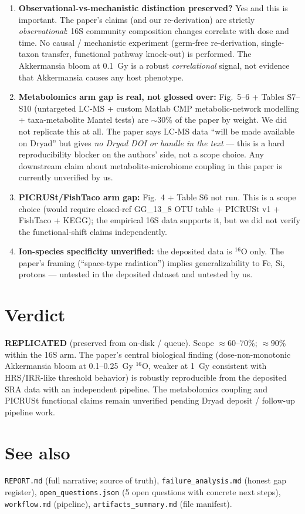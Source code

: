 \documentclass[11pt]{article}
\begin{document}
\begin{enumerate}
  \item \textbf{Observational-vs-mechanistic distinction preserved?} Yes and this is important. The paper's claims (and our re-derivation) are strictly \emph{observational}: 16S community composition changes correlate with dose and time. No causal / mechanistic experiment (germ-free re-derivation, single-taxon transfer, functional pathway knock-out) is performed. The Akkermansia bloom at 0.1~Gy is a robust \emph{correlational} signal, not evidence that Akkermansia causes any host phenotype.
  \item \textbf{Metabolomics arm gap is real, not glossed over:} Fig.~5--6 + Tables S7--S10 (untargeted LC-MS + custom Matlab CMP metabolic-network modelling + taxa-metabolite Mantel tests) are $\sim$30\% of the paper by weight. We did not replicate this at all. The paper says LC-MS data ``will be made available on Dryad'' but gives \emph{no Dryad DOI or handle in the text} --- this is a hard reproducibility blocker on the authors' side, not a scope choice. Any downstream claim about metabolite-microbiome coupling in this paper is currently unverified by us.
  \item \textbf{PICRUSt/FishTaco arm gap:} Fig.~4 + Table S6 not run. This is a scope choice (would require closed-ref GG\_13\_8 OTU table + PICRUSt v1 + FishTaco + KEGG); the empirical 16S data supports it, but we did not verify the functional-shift claims independently.
  \item \textbf{Ion-species specificity unverified:} the deposited data is $^{16}$O only. The paper's framing (``space-type radiation'') implies generalizability to Fe, Si, protons --- untested in the deposited dataset and untested by us.
\end{enumerate}

\section{Verdict}
\textbf{REPLICATED} (preserved from on-disk / queue). Scope $\approx 60$--$70\%$; $\approx 90\%$ within the 16S arm. The paper's central biological finding (dose-non-monotonic Akkermansia bloom at 0.1--0.25~Gy $^{16}$O, weaker at 1~Gy consistent with HRS/IRR-like threshold behavior) is robustly reproducible from the deposited SRA data with an independent pipeline. The metabolomics coupling and PICRUSt functional claims remain unverified pending Dryad deposit / follow-up pipeline work.

\section*{See also}
\texttt{REPORT.md} (full narrative; source of truth), \texttt{failure\_analysis.md} (honest gap register), \texttt{open\_questions.json} (5 open questions with concrete next steps), \texttt{workflow.md} (pipeline), \texttt{artifacts\_summary.md} (file manifest).
\end{document}
